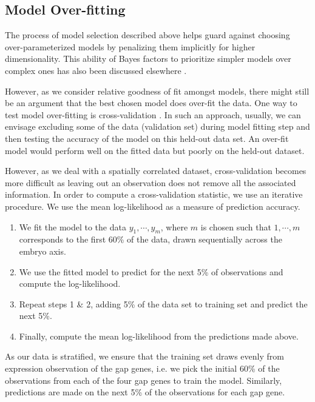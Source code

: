 \subsection{Model Over-fitting}

The process of model selection described above helps guard against choosing over-parameterized models by penalizing them implicitly for higher dimensionality. This ability of Bayes factors to prioritize simpler models over complex ones has also been discussed elsewhere \cite{jeffreys92,girolami08a}. 

However, as we consider relative goodness of fit amongst models, there might still be an argument that the best chosen model does over-fit the data. One way to test model over-fitting is cross-validation \cite{Kohavi95astudy}. In such an approach, usually, we can envisage excluding some of the data (validation set) during model fitting step  and then testing the accuracy of the model on this held-out data set. An over-fit model would perform well on the fitted data but poorly on the held-out dataset. 

However, as we deal with a spatially correlated dataset, cross-validation becomes more difficult as leaving out an observation does not remove all the associated information. In order to compute a cross-validation statistic, we use an iterative procedure. We use the mean log-likelihood as a measure of prediction accuracy. 

\begin{enumerate}
\item We fit the model to the data $y_1, \cdots, y_m$, where $m$ is chosen such that $1, \cdots, m$ corresponds to the first 60\% of the data, drawn sequentially across the embryo axis.
\item We use the fitted model to predict for the next 5\% of observations and compute the log-likelihood.
\item Repeat steps 1 \& 2, adding 5\% of the data set to training set and predict the next 5\%. 
\item Finally, compute the mean log-likelihood from the predictions made above.
\end{enumerate}

As our data is stratified, we ensure that the training set draws evenly from expression observation of the gap genes, i.e. we pick the initial 60\% of the observations from each of the four gap genes to train the model. Similarly, predictions are made on the next 5\% of the observations for each gap gene.

